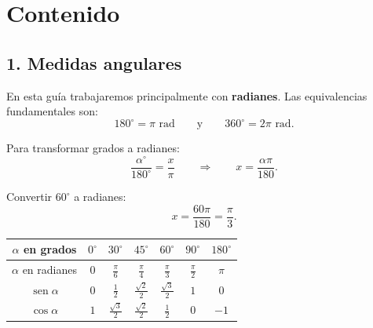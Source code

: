 \documentclass[12pt,letterpaper]{article}
\providecommand{\sen}{\operatorname{sen}}
\begin{document}
\tableofcontents
\newpage

\section{Contenido}

\begingroup
\setlength{\abovedisplayskip}{5pt}
\setlength{\belowdisplayskip}{5pt}
\setlength{\abovedisplayshortskip}{3pt}
\setlength{\belowdisplayshortskip}{3pt}
\subsection{1. Medidas angulares}

En esta guía trabajaremos principalmente con \textbf{radianes}. Las equivalencias fundamentales son:
\[
180^\circ=\pi \text{ rad}
\qquad\text{y}\qquad
360^\circ=2\pi \text{ rad}.
\]

\begin{formulabox}
Para transformar grados a radianes:
\[
\frac{\alpha^\circ}{180^\circ}=\frac{x}{\pi}
\qquad\Longrightarrow\qquad
x=\frac{\alpha\pi}{180}.
\]
\end{formulabox}

\begin{ejemplobox}
Convertir $60^\circ$ a radianes:
\[
x=\frac{60\pi}{180}=\frac{\pi}{3}.
\]
\end{ejemplobox}

\begin{center}
\renewcommand{\arraystretch}{1.25}
\begin{tabular}{c|cccccc}
\toprule
$\alpha$ en grados & $0^\circ$ & $30^\circ$ & $45^\circ$ & $60^\circ$ & $90^\circ$ & $180^\circ$ \\
\midrule
$\alpha$ en radianes & $0$ & $\frac{\pi}{6}$ & $\frac{\pi}{4}$ & $\frac{\pi}{3}$ & $\frac{\pi}{2}$ & $\pi$ \\
$\sen\alpha$ & $0$ & $\frac12$ & $\frac{\sqrt2}{2}$ & $\frac{\sqrt3}{2}$ & $1$ & $0$ \\
$\cos\alpha$ & $1$ & $\frac{\sqrt3}{2}$ & $\frac{\sqrt2}{2}$ & $\frac12$ & $0$ & $-1$ \\
\bottomrule
\end{tabular}
\end{center}
\end{document}
